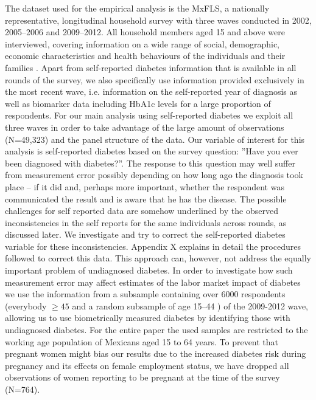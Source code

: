 \documentclass[12pt,english,british]{article}
\begin{document}
The dataset used for the empirical analysis is the \acf{MxFLS},
a nationally representative, longitudinal household survey with three
waves conducted in 2002, 2005--2006 and 2009--2012.
All household members aged 15 and above were interviewed, covering information
on a wide range of social, demographic, economic characteristics and
health behaviours of the individuals and their families
\citep{Rubalcava2013}. Apart from self-reported diabetes information that is available in all rounds of the survey, we also specifically use information provided exclusively in the most recent wave, i.e. information
on the self-reported year of diagnosis as well as biomarker data including \ac{HbA1c} levels for a large proportion of respondents.  For our main analysis using self-reported diabetes we exploit all three waves in order to
take advantage of the large amount of observations (N=49,323) and the panel structure
of the data. Our variable of interest for this analysis is self-reported
diabetes based on the survey question: ''Have you
ever been diagnosed with diabetes?''. The response to this question
may well suffer from measurement error possibly depending on how long ago the diagnosis took place -- if it did and, perhaps more important, whether the respondent was communicated the result and is aware
that he has the disease. The possible challenges for self reported data are somehow underlined by the observed inconsistencies in the self reports for the same individuals across rounds, as discussed later. 
We investigate and try to correct the self-reported diabetes variable for these inconsistencies. Appendix X explains in detail the procedures followed to correct this data.  This approach can, however, not address the equally  important problem of undiagnosed diabetes. In order to investigate how such measurement
error may affect estimates of the labor market impact of diabetes
we use the information from a subsample containing over 6000 respondents (everybody $\geq 45$ and a random subsample of age 15--44 \citep{Crimmins2015}) of the 2009-2012 wave, allowing us to use biometrically measured diabetes by identifying those with undiagnosed diabetes. For the entire paper the used samples are restricted to the working age population of Mexicans aged 15 to 64 years. To prevent that pregnant women might bias our results due to the increased diabetes risk during pregnancy and its effects on female employment status, we have dropped all observations of women reporting to be pregnant at the time of the survey (N=764).
\end{document}
